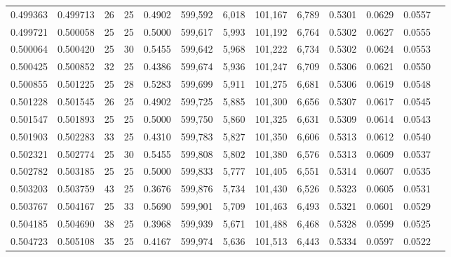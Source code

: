 \begin{tabular}{rrrrrrrrrrrrr}
0.499363 & 0.499713 &    26 &  25 &                                     0.4902 & 599,592 &   6,018 & 101,167 &   6,789 & 0.5301 & 0.0629 & 0.0557 \\
0.499721 & 0.500058 &    25 &  25 &                                     0.5000 & 599,617 &   5,993 & 101,192 &   6,764 & 0.5302 & 0.0627 & 0.0555 \\
0.500064 & 0.500420 &    25 &  30 &                                     0.5455 & 599,642 &   5,968 & 101,222 &   6,734 & 0.5302 & 0.0624 & 0.0553 \\
0.500425 & 0.500852 &    32 &  25 &                                     0.4386 & 599,674 &   5,936 & 101,247 &   6,709 & 0.5306 & 0.0621 & 0.0550 \\
0.500855 & 0.501225 &    25 &  28 &                                     0.5283 & 599,699 &   5,911 & 101,275 &   6,681 & 0.5306 & 0.0619 & 0.0548 \\
0.501228 & 0.501545 &    26 &  25 &                                     0.4902 & 599,725 &   5,885 & 101,300 &   6,656 & 0.5307 & 0.0617 & 0.0545 \\
0.501547 & 0.501893 &    25 &  25 &                                     0.5000 & 599,750 &   5,860 & 101,325 &   6,631 & 0.5309 & 0.0614 & 0.0543 \\
0.501903 & 0.502283 &    33 &  25 &                                     0.4310 & 599,783 &   5,827 & 101,350 &   6,606 & 0.5313 & 0.0612 & 0.0540 \\
0.502321 & 0.502774 &    25 &  30 &                                     0.5455 & 599,808 &   5,802 & 101,380 &   6,576 & 0.5313 & 0.0609 & 0.0537 \\
0.502782 & 0.503185 &    25 &  25 &                                     0.5000 & 599,833 &   5,777 & 101,405 &   6,551 & 0.5314 & 0.0607 & 0.0535 \\
0.503203 & 0.503759 &    43 &  25 &                                     0.3676 & 599,876 &   5,734 & 101,430 &   6,526 & 0.5323 & 0.0605 & 0.0531 \\
0.503767 & 0.504167 &    25 &  33 &                                     0.5690 & 599,901 &   5,709 & 101,463 &   6,493 & 0.5321 & 0.0601 & 0.0529 \\
0.504185 & 0.504690 &    38 &  25 &                                     0.3968 & 599,939 &   5,671 & 101,488 &   6,468 & 0.5328 & 0.0599 & 0.0525 \\
0.504723 & 0.505108 &    35 &  25 &                                     0.4167 & 599,974 &   5,636 & 101,513 &   6,443 & 0.5334 & 0.0597 & 0.0522 \\

\end{tabular}
